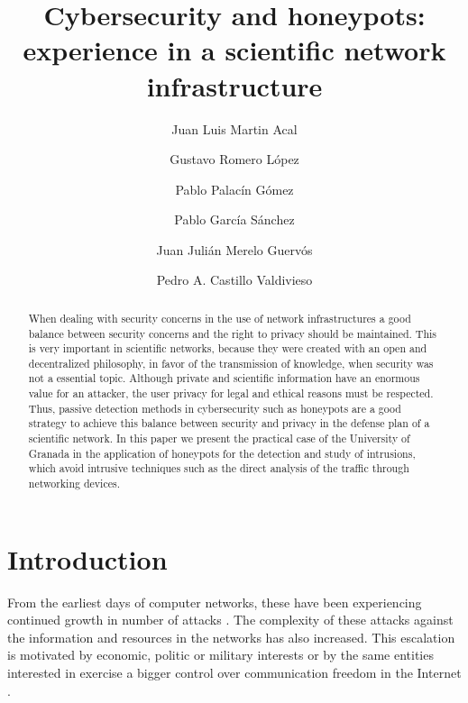 \documentclass[a4paper]{llncs}
\begin{document}
	\pagestyle{empty}

	\mainmatter

	\title{Cybersecurity and honeypots: experience in a scientific network infrastructure} 


	\author{Juan Luis Martin Acal \and Gustavo Romero López \and Pablo Palacín Gómez \and Pablo García Sánchez \and Juan Julián Merelo Guervós \and Pedro A. Castillo Valdivieso }



	\maketitle

\begin{abstract}
When dealing with security concerns in the use of network infrastructures a good balance between security concerns and the right to privacy should be maintained. This is very important in scientific networks, because they were created with an open and decentralized philosophy, in favor of the transmission of knowledge, when security was not a essential topic.
Although private and scientific information have an enormous value for
an attacker, the user privacy for legal and ethical reasons must be
respected. Thus, passive detection methods in cybersecurity such as
honeypots are a good strategy to achieve this balance between security
and privacy in the defense plan of a scientific network. In this paper
we present the practical case of the University of Granada in the
application of honeypots for the detection and study of intrusions,
which avoid intrusive techniques such as the direct analysis of the
traffic through networking devices. 
\end{abstract}


\section{Introduction}
From the earliest days of computer networks, these have been
experiencing continued growth in number of attacks
\cite{esset-tendencias,cni-ccn-tendencias-2014,cni-ccn-tendencias-2015}. The
complexity of these attacks against the information and resources in
the networks has also increased. This escalation is motivated by
economic, politic or military interests or by the same entities
interested in exercise a bigger control over communication freedom in
the Internet \cite{cni-ccn-tendencias-2015,cisco-2014}. 
\end{document}

